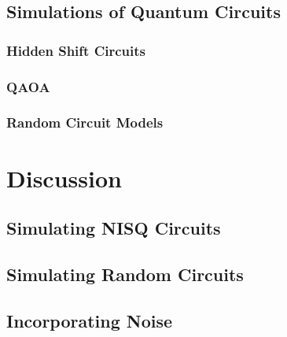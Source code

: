 \subsection{Simulations of Quantum Circuits}
\subsubsection*{Hidden Shift Circuits}
\subsubsection*{QAOA}
\subsubsection*{Random Circuit Models}
\section{Discussion}
\subsection{Simulating NISQ Circuits}
\subsection{Simulating Random Circuits}
\subsection{Incorporating Noise}
